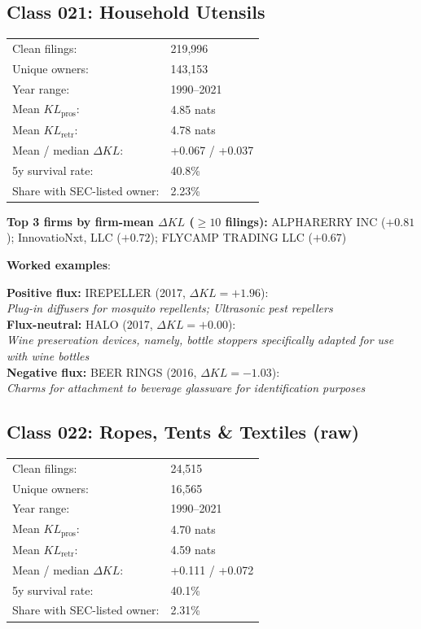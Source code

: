 \subsection*{Class 021: Household Utensils}
\label{app:industry-021}

\begin{tabular}{ll}
Clean filings: & 219,996 \\
Unique owners: & 143,153 \\
Year range: & 1990--2021 \\
Mean $KL_\text{pros}$: & 4.85 nats \\
Mean $KL_\text{retr}$: & 4.78 nats \\
Mean / median $\Delta KL$: & +0.067 / +0.037 \\
5y survival rate: & 40.8\% \\
Share with SEC-listed owner: & 2.23\% \\
\end{tabular}

\textbf{Top 3 firms by firm-mean $\Delta KL$ ($\geq 10$ filings):} ALPHARERRY INC ($+0.81$); InnovatioNxt, LLC ($+0.72$); FLYCAMP TRADING LLC ($+0.67$)

\textbf{Worked examples}:

  \textbf{Positive flux:} \textsc{IREPELLER} (2017, $\Delta KL=+1.96$):\\
  \textit{Plug-in diffusers for mosquito repellents; Ultrasonic pest repellers}\\
  \textbf{Flux-neutral:} \textsc{HALO} (2017, $\Delta KL=+0.00$):\\
  \textit{Wine preservation devices, namely, bottle stoppers specifically adapted for use with wine bottles}\\
  \textbf{Negative flux:} \textsc{BEER RINGS} (2016, $\Delta KL=-1.03$):\\
  \textit{Charms for attachment to beverage glassware for identification purposes}\\

\subsection*{Class 022: Ropes, Tents \& Textiles (raw)}
\label{app:industry-022}

\begin{tabular}{ll}
Clean filings: & 24,515 \\
Unique owners: & 16,565 \\
Year range: & 1990--2021 \\
Mean $KL_\text{pros}$: & 4.70 nats \\
Mean $KL_\text{retr}$: & 4.59 nats \\
Mean / median $\Delta KL$: & +0.111 / +0.072 \\
5y survival rate: & 40.1\% \\
Share with SEC-listed owner: & 2.31\% \\
\end{tabular}

